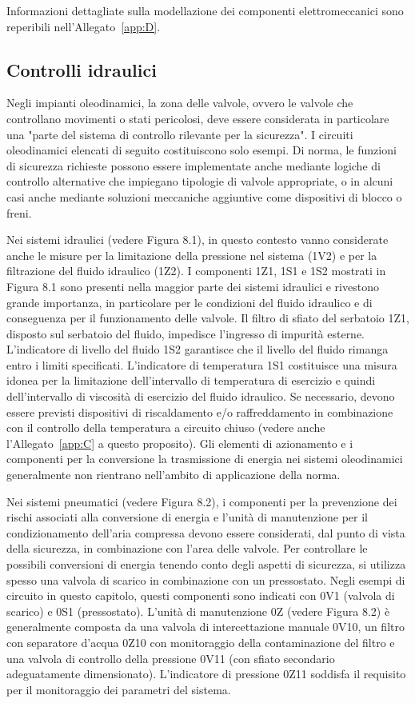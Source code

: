 Informazioni dettagliate sulla modellazione dei componenti elettromeccanici sono reperibili nell'Allegato~\ref{app:D}.


\subsection{Controlli idraulici}
\label{sec:08-1-2}
Negli impianti oleodinamici, la zona delle valvole, ovvero le valvole che controllano movimenti o stati pericolosi, deve essere considerata in particolare una "parte del sistema di controllo rilevante per la sicurezza". I circuiti oleodinamici elencati di seguito costituiscono solo esempi. Di norma, le funzioni di sicurezza richieste possono essere implementate anche mediante logiche di controllo alternative che impiegano tipologie di valvole appropriate, o in alcuni casi anche mediante soluzioni meccaniche aggiuntive come dispositivi di blocco o freni.

Nei sistemi idraulici (vedere Figura 8.1), in questo contesto vanno considerate anche le misure per la limitazione della pressione nel sistema (1V2) e per la filtrazione del fluido idraulico (1Z2).
I componenti 1Z1, 1S1 e 1S2 mostrati in Figura 8.1 sono presenti nella maggior parte dei sistemi idraulici e rivestono grande importanza, in particolare per le condizioni del fluido idraulico e di conseguenza per il funzionamento delle valvole.
Il filtro di sfiato del serbatoio 1Z1, disposto sul serbatoio del fluido, impedisce l'ingresso di impurità esterne. L'indicatore di livello del fluido 1S2 garantisce che il livello del fluido rimanga entro i limiti specificati. L'indicatore di temperatura 1S1 costituisce una misura idonea per la limitazione dell'intervallo di temperatura di esercizio e quindi dell'intervallo di viscosità di esercizio del fluido idraulico. Se necessario, devono essere previsti dispositivi di riscaldamento e/o raffreddamento in combinazione con il controllo della temperatura a circuito chiuso (vedere anche l'Allegato~\ref{app:C} a questo proposito).
Gli elementi di azionamento e i componenti per la conversione la trasmissione di energia nei sistemi oleodinamici generalmente non rientrano nell'ambito di applicazione della norma.

Nei sistemi pneumatici (vedere Figura 8.2), i componenti per la prevenzione dei rischi associati alla conversione di energia e l'unità di manutenzione per il condizionamento dell'aria compressa devono essere considerati, dal punto di vista della sicurezza, in combinazione con l'area delle valvole. Per controllare le possibili conversioni di energia tenendo conto degli aspetti di sicurezza, si utilizza spesso una valvola di scarico in combinazione con un pressostato. Negli esempi di circuito in questo capitolo, questi componenti sono indicati con 0V1 (valvola di scarico) e 0S1 (pressostato).
L'unità di manutenzione 0Z (vedere Figura 8.2) è generalmente composta da una valvola di intercettazione manuale 0V10, un filtro con separatore d'acqua 0Z10 con monitoraggio della contaminazione del filtro e una valvola di controllo della pressione 0V11 (con sfiato secondario adeguatamente dimensionato). L'indicatore di pressione 0Z11 soddisfa il requisito per il monitoraggio dei parametri del sistema.

